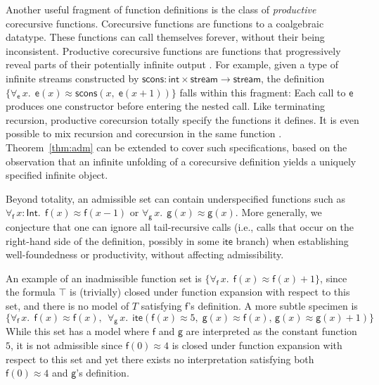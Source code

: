 \documentclass[runningheads,a4paper]{llncs}
\newcommand{\con}[1]{\mathsf{#1}}
\let\const=\con
\newcommand{\teq}{\approx}
\newcommand{\typeint}{\ty{Int}}
\newcommand\ty[1]{\con{#1}}
\newcommand{\ltrue}{\top}
\newcommand{\lite}{\con{ite}}
\newcommand{\forallf}[1]{\forall_{\!#1\:}}
\begin{document}
Another useful fragment of function definitions is the class of
\emph{productive} corecursive functions. Corecursive functions are functions to
a coalgebraic datatype. These functions can call themselves forever, without
their being inconsistent. Productive corecursive functions are functions that
progressively reveal parts of their potentially infinite
output \cite{turner-1995,mcbride-productive}.
For example, given a type of infinite streams constructed by
$\con{scons} : \ty{int} \times \ty{stream} \to \ty{stream}$,
the definition
$\{\forallf{\const{e}} x.\;\, \const{e}(x) \teq \con{scons}(x,\; \const{e}(x + 1))\}$
falls within this fragment: Each call to $\const{e}$ produces one
constructor before entering the nested call. Like terminating recursion,
productive corecursion totally specify the functions it defines.
It is even possible to mix recursion and corecursion in the same function
\cite{blanchette-et-al-2015-fouco}. Theorem~\ref{thm:adm} can be extended to
cover such specifications, based on the observation that an infinite unfolding
of a corecursive definition yields a uniquely specified infinite object.

Beyond totality, an admissible set can contain underspecified functions
such as $\forallf{\con{f}} x : \typeint.\;\, \con{f}( x )
\teq \con{f}( x - 1 )$ or $\forallf{\con{g}} x.\allowbreak\;\, \con{g}( x
) \teq \con{g}( x )$. More generally, we conjecture that one can ignore all
tail-recursive calls (i.e., calls that occur on the right-hand side of the
definition, possibly in some $\lite$ branch) when establishing well-foundedness
or productivity, without affecting admissibility.

An example of an inadmissible function set is
$\{ \forallf{\con{f}} x.\;\, \con{f}( x ) \teq \con{f}( x ) + 1 \}$,
since the formula $\ltrue$ is (trivially) closed under function expansion with respect to this set,
and there is no model of $T$
satisfying $\con{f}$'s definition. A more subtle specimen is
\[\{ 
 \forallf{\con{f}} x.\;\, \con{f}( x ) \teq \con{f}( x ),\;\,
 \forallf{\con{g}} x.\;\, \lite( \con{f}( x ) \teq 5,\;
   \con{g}( x ) \teq \con{f}( x ),\,
   \con{g}( x ) \teq \con{g}( x ) + 1)
\}\]
While this set has a model where $\con f$ and $\con g$ are interpreted as the
constant function $5$, it is not admissible since %
$\con{f}( 0 ) \teq 4$ is
closed under function expansion with respect to this set and yet there exists
no interpretation satisfying both $\con{f}( 0 ) \teq 4$ and $\con{g}$'s
definition.

\end{document}
